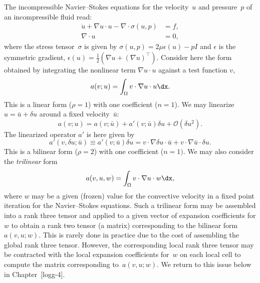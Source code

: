The incompressible Navier--Stokes equations for the velocity~$u$ and
pressure~$p$ of an incompressible fluid read:
\begin{displaymath}
  \begin{split}
    \dot{u} + \nabla u \cdot u - \nabla \cdot \sigma(u, p) &= f, \\
    \nabla \cdot u &= 0,
  \end{split}
\end{displaymath}
where the stress tensor~$\sigma$ is given by $\sigma(u, p) = 2 \mu
\epsilon(u) - p I$ and $\epsilon$ is the symmetric gradient,
$\epsilon(u) = \frac{1}{2}(\nabla u + (\nabla u)^{\top})$. Consider
here the form obtained by integrating the nonlinear term $\nabla u
\cdot u$ against a test function $v$,
\begin{displaymath}
  a(v; u) = \int_{\Omega} v \cdot \nabla u \cdot u \dx.
\end{displaymath}
This is a linear form ($\rho = 1$) with one coefficient ($n = 1$).  We
may linearize $u = \bar{u} + \delta u$ around a fixed
velocity~$\bar{u}$:
\begin{displaymath}
  a(v; u) = a(v; \bar{u}) + a'(v; \bar{u}) \delta u + \mathcal{O}(\delta u^2).
\end{displaymath}
The linearized operator $a'$ is here given by
\begin{displaymath}
  a'(v, \delta u; \bar{u}) \equiv a'(v; \bar{u}) \delta u = v \cdot
  \nabla \delta u \cdot \bar{u} + v \cdot \nabla \bar{u} \cdot \delta
  u.
\end{displaymath}
This is a bilinear form ($\rho = 2$) with one coefficient ($n = 1)$.
We may also consider the \emph{trilinear} form
\begin{displaymath}
  a(v, u, w) = \int_{\Omega} v \cdot \nabla u \cdot w \dx,
\end{displaymath}
where $w$ may be a given (frozen) value for the convective velocity in
a fixed point iteration for the Navier--Stokes equations. Such a
trilinear form may be assembled into a rank three tensor and applied
to a given vector of expansion coefficients for $w$ to obtain a rank
two tensor (a matrix) corresponding to the bilinear form $a(v, u; w)$.
This is rarely done in practice due to the cost of assembling the
global rank three tensor. However, the corresponding local rank three
tensor may be contracted with the local expansion coefficients for~$w$
on each local cell to compute the matrix corresponding to~$a(v, u;
w)$. We return to this issue below in Chapter~[logg-4].

